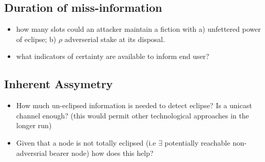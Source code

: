 \documentclass{article}
\theoremstyle{definition}{
  \newtheorem{lemma}{Lemma}[section] %
  \newtheorem{definition}[lemma]{Definition}
}
\theoremstyle{theorem}{
  \newtheorem{invariant}[lemma]{Invariant}
  \newtheorem{proofobligation}[lemma]{Proof Obligation}
}
\numberwithin{equation}{lemma}
\begin{document}
\subsection{Duration of miss-information}
\begin{itemize}
\item how many slots could an attacker maintain a fiction with a)
  unfettered power of eclipse; b) $\rho$ adverserial stake at its disposal.
\item what indicators of certainty are available to inform end user?
\end{itemize}
\subsection{Inherent Assymetry}
\begin{itemize}
\item How much un-eclipsed information is needed to detect eclipse? Is
  a unicast channel enough? (this would permit other technological
  approaches in the longer run)
\item Given that a node is not totally eclipsed (i.e $\exists$
  potentially reachable non-adversrial bearer node) how does this help?
\end{itemize}  
\end{document}
